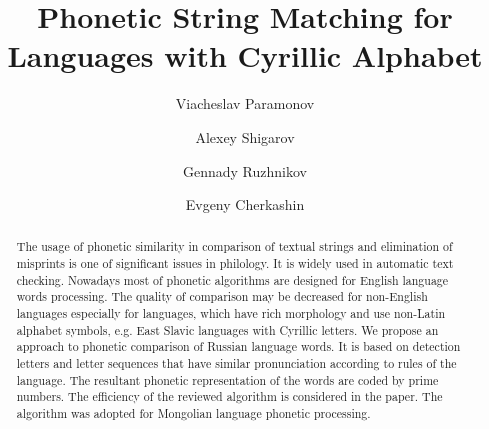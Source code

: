 \documentclass{svproc}
\begin{document}
\mainmatter              %
%
\title{Phonetic String Matching for Languages with Cyrillic Alphabet }
%
%
\author{Viacheslav Paramonov   \and Alexey Shigarov 
\and Gennady Ruzhnikov \and Evgeny Cherkashin  }
%
%
%

\maketitle              %

\begin{abstract}

The usage of phonetic similarity in comparison of textual strings and elimination of misprints is one of significant issues in philology. It is widely used in automatic text checking. Nowadays most of phonetic algorithms are designed for English language words processing. The quality of comparison may be decreased for non-English languages especially for languages, which have rich morphology and use non-Latin alphabet symbols, e.g. East Slavic languages with Cyrillic letters. We propose an approach to phonetic comparison of Russian language words. It is based on detection letters and letter sequences that have similar pronunciation according to rules of the language. The resultant phonetic representation of the words are coded by prime numbers. The efficiency of the reviewed algorithm is considered in the paper. The algorithm was adopted for Mongolian language phonetic processing.
\end{abstract}
\end{document}
